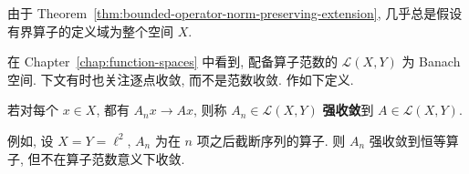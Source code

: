 由于 Theorem~\ref{thm:bounded-operator-norm-preserving-extension}, 几乎总是假设有界算子的定义域为整个空间 $X$.

在 Chapter~\ref{chap:function-spaces} 中看到, 配备算子范数的 $\mathcal{L}(X,Y)$ 为 Banach 空间. 下文有时也关注逐点收敛, 而不是范数收敛. 作如下定义.

\begin{Definition}
\label{def:operator-strong-convergence}
若对每个 $x\in X$, 都有 $A_nx\to Ax$, 则称 $A_n\in\mathcal{L}(X,Y)$ \textbf{强收敛}到 $A\in\mathcal{L}(X,Y)$.
\end{Definition}

例如, 设 $X=Y=\ell^2$, $A_n$ 为在 $n$ 项之后截断序列的算子. 则 $A_n$ 强收敛到恒等算子, 但不在算子范数意义下收敛.
